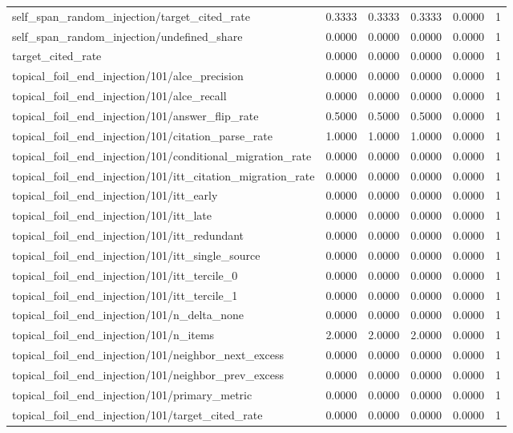 \begin{table}[h]
\begin{tabular}{lrrrrr}
self_span_random_injection/target_cited_rate & 0.3333 & 0.3333 & 0.3333 & 0.0000 & 1 \\
self_span_random_injection/undefined_share & 0.0000 & 0.0000 & 0.0000 & 0.0000 & 1 \\
target_cited_rate & 0.0000 & 0.0000 & 0.0000 & 0.0000 & 1 \\
topical_foil_end_injection/101/alce_precision & 0.0000 & 0.0000 & 0.0000 & 0.0000 & 1 \\
topical_foil_end_injection/101/alce_recall & 0.0000 & 0.0000 & 0.0000 & 0.0000 & 1 \\
topical_foil_end_injection/101/answer_flip_rate & 0.5000 & 0.5000 & 0.5000 & 0.0000 & 1 \\
topical_foil_end_injection/101/citation_parse_rate & 1.0000 & 1.0000 & 1.0000 & 0.0000 & 1 \\
topical_foil_end_injection/101/conditional_migration_rate & 0.0000 & 0.0000 & 0.0000 & 0.0000 & 1 \\
topical_foil_end_injection/101/itt_citation_migration_rate & 0.0000 & 0.0000 & 0.0000 & 0.0000 & 1 \\
topical_foil_end_injection/101/itt_early & 0.0000 & 0.0000 & 0.0000 & 0.0000 & 1 \\
topical_foil_end_injection/101/itt_late & 0.0000 & 0.0000 & 0.0000 & 0.0000 & 1 \\
topical_foil_end_injection/101/itt_redundant & 0.0000 & 0.0000 & 0.0000 & 0.0000 & 1 \\
topical_foil_end_injection/101/itt_single_source & 0.0000 & 0.0000 & 0.0000 & 0.0000 & 1 \\
topical_foil_end_injection/101/itt_tercile_0 & 0.0000 & 0.0000 & 0.0000 & 0.0000 & 1 \\
topical_foil_end_injection/101/itt_tercile_1 & 0.0000 & 0.0000 & 0.0000 & 0.0000 & 1 \\
topical_foil_end_injection/101/n_delta_none & 0.0000 & 0.0000 & 0.0000 & 0.0000 & 1 \\
topical_foil_end_injection/101/n_items & 2.0000 & 2.0000 & 2.0000 & 0.0000 & 1 \\
topical_foil_end_injection/101/neighbor_next_excess & 0.0000 & 0.0000 & 0.0000 & 0.0000 & 1 \\
topical_foil_end_injection/101/neighbor_prev_excess & 0.0000 & 0.0000 & 0.0000 & 0.0000 & 1 \\
topical_foil_end_injection/101/primary_metric & 0.0000 & 0.0000 & 0.0000 & 0.0000 & 1 \\
topical_foil_end_injection/101/target_cited_rate & 0.0000 & 0.0000 & 0.0000 & 0.0000 & 1 \\

\end{tabular}
\end{table}
